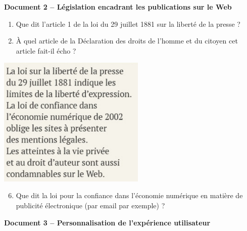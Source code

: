 \documentclass[a4paper]{article}
\begin{document}
\bigskip

\textbf{Document 2 -- Législation encadrant les publications sur le Web} 

\smallskip

\begin{multicols}{2}
  \begin{enumerate}[resume]
    \item Que dit l'article 1 de la loi du 29 juillet 1881 sur la liberté de la presse ?
    \item À quel article de la Déclaration des droits de l'homme et du citoyen cet article fait-il écho ?
  \end{enumerate}

  \begin{center}
    \includegraphics[width=7cm]{legislation_publications_web.png}
  \end{center}
\end{multicols}

\begin{enumerate}
  \setcounter{enumi}{5}
\item Que dit la loi pour la confiance dans l'économie numérique en matière de publicité électronique (par email par exemple) ?
\end{enumerate}

\pagebreak

\textbf{Document 3 -- Personnalisation de l'expérience utilisateur} 

\medskip
\end{document}
